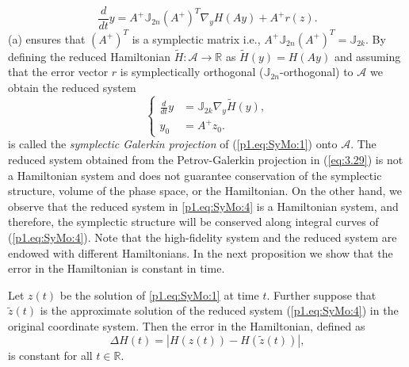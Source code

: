 \begin{equation} \label{p1.eq:SyMo:3}
	\frac d {dt} y = A^+ \mathbb J_{2n} (A^+)^T \nabla_{y} H(A y) + A^+ r(z).
\end{equation}
 (a) ensures that $(A^+)^T$ is a symplectic matrix i.e., $A^+ \mathbb J_{2n} (A^+)^T = \mathbb{J}_{2k}$. By defining the reduced Hamiltonian $\tilde H:\mathcal A \to \mathbb R$ as $\tilde H (y) = H(Ay)$ and assuming that the error vector $r$ is symplectically orthogonal ($\mathbb J_{2n}$-orthogonal) to $\mathcal A$ we obtain the reduced system
\begin{equation} \label{p1.eq:SyMo:4}
\left\{
\begin{aligned}
	 \frac{d}{dt} y &= \mathbb J_{2k} \nabla_{y} \tilde H(y), \\
	 y_0 &= A^+ z_0.
\end{aligned}
\right.
\end{equation}
 is called the \emph{symplectic Galerkin projection} of (\ref{p1.eq:SyMo:1}) onto $\mathcal A$. The reduced system obtained from the Petrov-Galerkin projection in (\ref{eq:3.29}) is not a Hamiltonian system and does not guarantee conservation of the symplectic structure, volume of the phase space, or the Hamiltonian. On the other hand, we observe that the reduced system in \eqref{p1.eq:SyMo:4} is a Hamiltonian system, and therefore, the symplectic structure will be conserved along integral curves of (\ref{p1.eq:SyMo:4}). Note that the high-fidelity system and the reduced system are endowed with different Hamiltonians. In the next proposition we show that the error in the Hamiltonian is constant in time. 


\begin{proposition} \label{p1.theorem:2}
Let ${z} (t)$ be the solution of \eqref{p1.eq:SyMo:1} at time $t$. Further suppose that $\tilde{{z}} (t)$ is the approximate solution of the reduced system (\ref{p1.eq:SyMo:4}) in the original coordinate system. Then the error in the Hamiltonian, defined as
\begin{equation} \label{p1.eq:SyMo:5}
	\Delta H(t)  = |H(z(t)) - H(\tilde{z}(t))|,
\end{equation}
is constant for all $t\in \mathbb R$.
\end{proposition}

